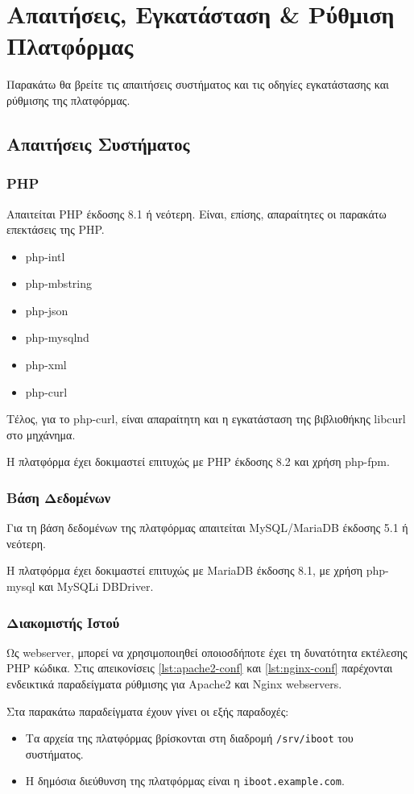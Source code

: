 \chapter{Απαιτήσεις, Εγκατάσταση \& Ρύθμιση Πλατφόρμας}
Παρακάτω θα βρείτε τις απαιτήσεις συστήματος και τις οδηγίες εγκατάστασης και ρύθμισης της πλατφόρμας.

\section{Απαιτήσεις Συστήματος}

\subsection{PHP}
Απαιτείται PHP έκδοσης 8.1 ή νεότερη.
Είναι, επίσης, απαραίτητες οι παρακάτω επεκτάσεις της PHP.

\begin{itemize}
	\item php-intl
	\item php-mbstring
	\item php-json
	\item php-mysqlnd
	\item php-xml
	\item php-curl
\end{itemize}

Τέλος, για το php-curl, είναι απαραίτητη και η εγκατάσταση της βιβλιοθήκης libcurl στο μηχάνημα.

Η πλατφόρμα έχει δοκιμαστεί επιτυχώς με PHP έκδοσης 8.2 και χρήση php-fpm.

\subsection{Βάση Δεδομένων}
Για τη βάση δεδομένων της πλατφόρμας απαιτείται MySQL/MariaDB έκδοσης 5.1 ή νεότερη.

Η πλατφόρμα έχει δοκιμαστεί επιτυχώς με MariaDB έκδοσης 8.1, με χρήση php-mysql και MySQLi DBDriver.

\subsection{Διακομιστής Ιστού}
Ως webserver, μπορεί να χρησιμοποιηθεί οποιοσδήποτε έχει τη δυνατότητα εκτέλεσης PHP κώδικα. Στις απεικονίσεις \ref{lst:apache2-conf} και \ref{lst:nginx-conf} παρέχονται ενδεικτικά παραδείγματα ρύθμισης για Apache2 και Nginx webservers.

Στα παρακάτω παραδείγματα έχουν γίνει οι εξής παραδοχές:
\begin{itemize}
	\item Τα αρχεία της πλατφόρμας βρίσκονται στη διαδρομή \verb!/srv/iboot! του συστήματος.
	\item Η δημόσια διεύθυνση της πλατφόρμας είναι η \verb!iboot.example.com!.
\end{itemize}

